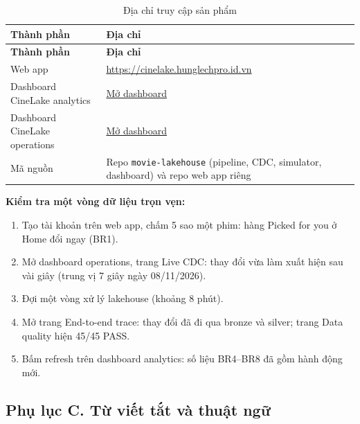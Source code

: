 \documentclass[a4paper,11pt]{article}
\newlength{\reporttablewidth}
\begin{document}
\begingroup
\small
{}
\setlength{\tabcolsep}{4pt}
\renewcommand{\arraystretch}{1.18}
\setlength{\reporttablewidth}{\dimexpr\linewidth-2\tabcolsep\relax}
\begin{longtable}{@{}L{0.35\reporttablewidth} L{0.65\reporttablewidth}@{}}
\caption[Địa chỉ truy cập sản phẩm (Phụ lục B)]{Địa chỉ truy cập sản phẩm}\label{tab:24} \\
\toprule
\textbf{Thành phần} & \textbf{Địa chỉ} \\
\midrule
\endfirsthead
\toprule
\textbf{Thành phần} & \textbf{Địa chỉ} \\
\midrule
\endhead
\midrule
\endfoot
\bottomrule
\endlastfoot
Web app & \url{https://cinelake.hunglechpro.id.vn} \\
Dashboard CineLake analytics & \href{https://dbc-13f9afb0-c92a.cloud.databricks.com/dashboardsv3/01f1d877b4ec15d7afa5ef27a6e02488/published?w=7474654576685354}{Mở dashboard} \\
Dashboard CineLake operations & \href{https://dbc-13f9afb0-c92a.cloud.databricks.com/dashboardsv3/01f1d95897841fa0bbcda3781d1a6aad/published?w=7474654576685354}{Mở dashboard} \\
Mã nguồn & Repo \texttt{movie-lakehouse} (pipeline, CDC, simulator, dashboard) và repo web app riêng \\
\end{longtable}
\endgroup

\textbf{Kiểm tra một vòng dữ liệu trọn vẹn:}

\begin{enumerate}
  \item Tạo tài khoản trên web app, chấm 5 sao một phim: hàng \textquotedbl{}Picked for you\textquotedbl{} ở Home đổi ngay (BR1).
  \item Mở dashboard operations, trang Live CDC: thay đổi vừa làm xuất hiện sau vài giây (trung vị 7 giây ngày 08/11/2026).
  \item Đợi một vòng xử lý lakehouse (khoảng 8 phút).
  \item Mở trang End-to-end trace: thay đổi đã đi qua bronze và silver; trang Data quality hiện 45/45 PASS.
  \item Bấm refresh trên dashboard analytics: số liệu BR4--BR8 đã gồm hành động mới.
\end{enumerate}

\subsection*{Phụ lục C. Từ viết tắt và thuật ngữ}
\end{document}
